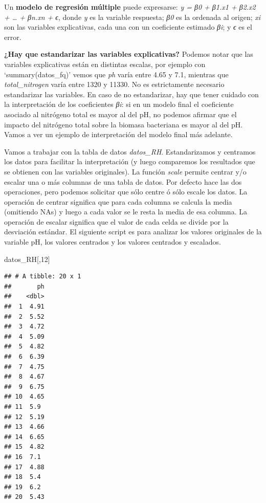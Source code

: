 \documentclass[
]{book}
\newenvironment{Shaded}{\begin{snugshade}}{\end{snugshade}}
\newcommand{\DecValTok}[1]{\textcolor[rgb]{0.00,0.00,0.81}{#1}}
\newcommand{\NormalTok}[1]{#1}
\begin{document}
Un \textbf{modelo de regresión múltiple} puede expresarse: \emph{y = β0 + β1.x1 + β2.x2 + \ldots{} + βn.xn + ϵ}, donde \emph{y} es la variable respuesta; \emph{β0} es la ordenada al origen; \emph{xi} son las variables explicativas, cada una con un coeficiente estimado \emph{βi}; y \emph{ϵ} es el error.

\textbf{¿Hay que estandarizar las variables explicativas?} Podemos notar que las variables explicativas están en distintas escalas, por ejemplo con `summary(datos\_fq)' vemos que \emph{ph} varía entre 4.65 y 7.1, mientras que \emph{total\_nitrogen} varía entre 1320 y 11330. No es estrictamente necesario estandarizar las variables. En caso de no estandarizar, hay que tener cuidado con la interpretación de los coeficientes \emph{βi}: si en un modelo final el coeficiente asociado al nitrógeno total es mayor al del pH, no podemos afirmar que el impacto del nitrógeno total sobre la biomasa bacteriana es mayor al del pH. Vamos a ver un ejemplo de interpretación del modelo final más adelante.

Vamos a trabajar con la tabla de datos \emph{datos\_RH}. Estandarizamos y centramos los datos para facilitar la interpretación (y luego comparemos los resultados que se obtienen con las variables originales). La función \emph{scale} permite centrar y/o escalar una o más columnas de una tabla de datos. Por defecto hace las dos operaciones, pero podemos solicitar que sólo centre ó sólo escale los datos. La operación de centrar significa que para cada columna se calcula la media (omitiendo NAs) y luego a cada valor se le resta la media de esa columna. La operación de escalar significa que el valor de cada celda se divide por la desviación estándar. El siguiente script es para analizar los valores originales de la variable pH, los valores centrados y los valores centrados y escalados.

\begin{Shaded}
\begin{Highlighting}[]
\NormalTok{datos\_RH[,}\DecValTok{12}\NormalTok{]}
\end{Highlighting}
\end{Shaded}

\begin{verbatim}
## # A tibble: 20 x 1
##       ph
##    <dbl>
##  1  4.91
##  2  5.52
##  3  4.72
##  4  5.09
##  5  4.82
##  6  6.39
##  7  4.75
##  8  4.67
##  9  6.75
## 10  4.65
## 11  5.9 
## 12  5.19
## 13  4.66
## 14  6.65
## 15  4.82
## 16  7.1 
## 17  4.88
## 18  5.4 
## 19  6.2 
## 20  5.43
\end{verbatim}
\end{document}
